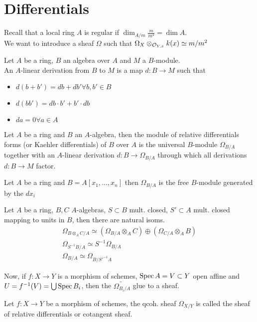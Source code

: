 \documentclass[../main.tex]{subfiles}
\begin{document}
\section{Differentials}
Recall that a local ring $A$ is regular if $\dim_{ A /m}  \frac{m}{m^{2}}= \dim A$.\\
We want to introduce a sheaf $\Omega$ such that $\Omega_X \otimes_{\mathcal{O}_{Y,x} } k( x) \simeq m /m^{2}$ 
\begin{defn}[Derivations]
	Let $A$ be a ring, $B$ an algebra over $A$ and $M$  a $B$-module.\\
	An $A$-linear derivation from $B$ to $M$ is a map $d:B \to M$ such that 
	\begin{itemize}
	\item $d( b+b') = db + db' \forall b,b' \in B$ 
	\item $d( bb') = db \cdot b' + b' \cdot db$ 
	\item $da = 0 \forall a \in A$
	\end{itemize}
\end{defn}
\begin{defn}
Let $A$ be a ring and $B$ an $A$-algebra, then the module of relative differentials forms (or Kaehler differentials) of $B$ over $A$ is the universal $B$-module $\Omega_{B / A} $ together with an $A$-linear derivation $d: B \to \Omega_{B / A} $ through which all derivations $d: B \to M$ factor.
\end{defn}
\begin{exemple}
Let $A$ be a ring and $B = A [ x_1,\ldots,x_n] $ then $\Omega_{B / A} $ is the free $B$-module generated by the $dx_i$ 
\end{exemple}
\begin{propo}
Let $A$  be a ring, $B,C$ $A$-algebras, $S \subset B$ mult. closed, $S' \subset A$ mult. closed mapping to units in $B$, then there are natural isoms.
\begin{align*}
\Omega_{B \otimes_A C / A } \simeq ( \Omega_{B / A} \otimes_A C) \oplus ( \Omega_{C / A} \otimes_A B) \\
\Omega_{S^{-1}B / A} \simeq S^{-1}\Omega_{B / A} \\
\Omega_{B / A} \simeq \Omega_{B / S'^{-1}A} 
\end{align*}
\end{propo}
Now, if $f:X\to Y$ is a morphism of schemes, $\operatorname{Spec} A = V \subset Y$ open affine and $U = f^{-1}( V) = \bigcup \operatorname{Spec} B_i$, then the $\widetilde{ \Omega_{B_i / A} }$ glue to a sheaf.
\begin{defn}
	Let $f:X\to Y$ be a morphism of schemes, the qcoh. sheaf $\Omega_{X /Y} $ is called the sheaf of relative differentials or cotangent sheaf.
\end{defn}	
\end{document}
